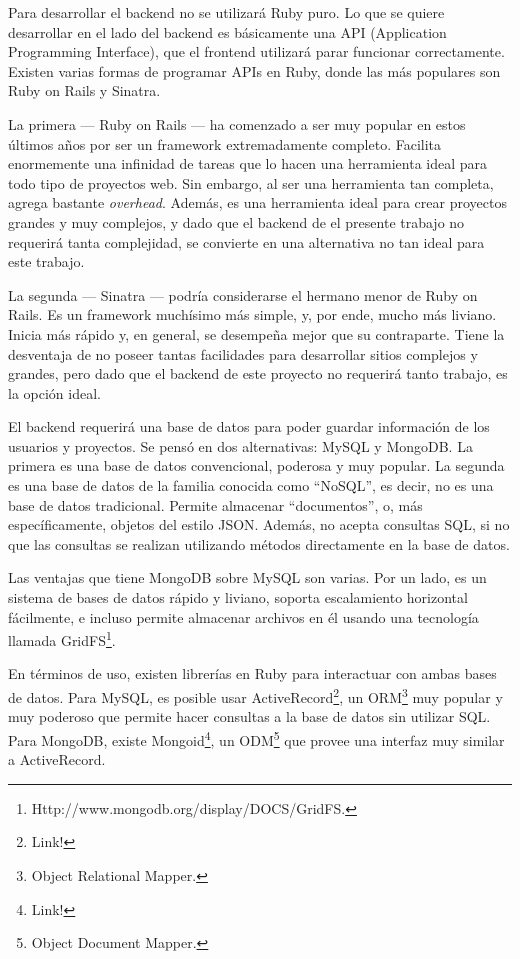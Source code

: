 \documentclass[12pt,titlepage,]{article}
\begin{document}
Para desarrollar el backend no se utilizará Ruby puro. Lo que se quiere
desarrollar en el lado del backend es básicamente una API (Application
Programming Interface), que el frontend utilizará parar funcionar
correctamente. Existen varias formas de programar APIs en Ruby, donde
las más populares son Ruby on Rails y Sinatra.

La primera --- Ruby on Rails --- ha comenzado a ser muy popular en estos
últimos años por ser un framework extremadamente completo. Facilita
enormemente una infinidad de tareas que lo hacen una herramienta ideal
para todo tipo de proyectos web. Sin embargo, al ser una herramienta tan
completa, agrega bastante \emph{overhead}. Además, es una herramienta
ideal para crear proyectos grandes y muy complejos, y dado que el
backend de el presente trabajo no requerirá tanta complejidad, se
convierte en una alternativa no tan ideal para este trabajo.

La segunda --- Sinatra --- podría considerarse el hermano menor de Ruby
on Rails. Es un framework muchísimo más simple, y, por ende, mucho más
liviano. Inicia más rápido y, en general, se desempeña mejor que su
contraparte. Tiene la desventaja de no poseer tantas facilidades para
desarrollar sitios complejos y grandes, pero dado que el backend de este
proyecto no requerirá tanto trabajo, es la opción ideal.

El backend requerirá una base de datos para poder guardar información de
los usuarios y proyectos. Se pensó en dos alternativas: MySQL y MongoDB.
La primera es una base de datos convencional, poderosa y muy popular. La
segunda es una base de datos de la familia conocida como ``NoSQL'', es
decir, no es una base de datos tradicional. Permite almacenar
``documentos'', o, más específicamente, objetos del estilo JSON. Además,
no acepta consultas SQL, si no que las consultas se realizan utilizando
métodos directamente en la base de datos.

Las ventajas que tiene MongoDB sobre MySQL son varias. Por un lado, es
un sistema de bases de datos rápido y liviano, soporta escalamiento
horizontal fácilmente, e incluso permite almacenar archivos en él usando
una tecnología llamada GridFS\footnote{Http://www.mongodb.org/display/DOCS/GridFS.}.

En términos de uso, existen librerías en Ruby para interactuar con ambas
bases de datos. Para MySQL, es posible usar ActiveRecord\footnote{Link!},
un ORM\footnote{Object Relational Mapper.} muy popular y muy poderoso
que permite hacer consultas a la base de datos sin utilizar SQL. Para
MongoDB, existe Mongoid\footnote{Link!}, un ODM\footnote{Object Document
  Mapper.} que provee una interfaz muy similar a ActiveRecord.
\end{document}

